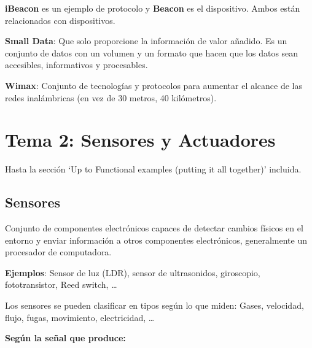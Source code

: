 \documentclass[12pt, twoside, openright]{report} %
\begin{document}
\textbf{iBeacon} es un ejemplo de protocolo y \textbf{Beacon} es el
dispositivo. Ambos están relacionados con dispositivos.

\textbf{Small Data}: Que solo proporcione la información de valor
añadido. Es un conjunto de datos con un volumen y un formato que hacen
que los datos sean accesibles, informativos y procesables.

\textbf{Wimax}: Conjunto de tecnologías y protocolos para aumentar el
alcance de las redes inalámbricas (en vez de 30 metros, 40 kilómetros).

\chapter{Tema 2: Sensores y
  Actuadores}


Hasta la sección `Up to Functional examples
(putting it all together)' incluida.

\section{Sensores}

Conjunto de componentes electrónicos capaces de detectar cambios físicos
en el entorno y enviar información a otros componentes electrónicos,
generalmente un procesador de computadora.

\textbf{Ejemplos}: Sensor de luz (LDR), sensor de ultrasonidos,
giroscopio, fototransistor, Reed switch, \ldots{}

Los sensores se pueden clasificar en tipos según lo que miden: Gases,
velocidad, flujo, fugas, movimiento, electricidad, \ldots{}

\textbf{Según la señal que produce:}
\end{document}
